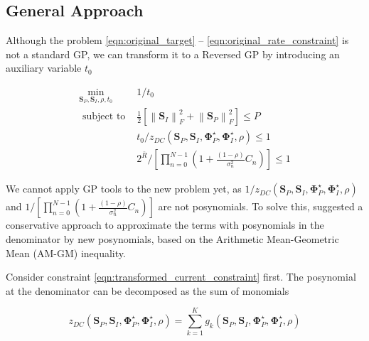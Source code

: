 \subsection{General Approach}\label{sec:general-approach}
Although the problem \eqref{eqn:original_target} -- \eqref{eqn:original_rate_constraint} is not a standard GP, we can transform it to a Reversed GP by introducing an auxiliary variable ${t_0}$ \cite{Chiang2005}

\begin{eqnarray}
  {\mathop {\min }\limits_{{{\mathbf{S}}_P},{{\mathbf{S}}_I},\rho ,{t_0}} }&{1/{t_0}} \label{eqn:transformed_target} \\
  {{\text{ subject to }}}&{\frac{1}{2}\left[ {\left\| {{{\mathbf{S}}_I}} \right\|_F^2 + \left\| {{{\mathbf{S}}_P}} \right\|_F^2} \right] \leqslant P} \label{eqn:transformed_power_constraint} \\
  {}&{{t_0}/{z_{DC}}\left( {{{\mathbf{S}}_P},{{\mathbf{S}}_I},{\mathbf{\Phi }}_P^ \star ,{\mathbf{\Phi }}_I^ \star ,\rho } \right) \leqslant 1} \label{eqn:transformed_current_constraint} \\
  {}&{{2^{\bar R}}/\left[ {\prod\limits_{n = 0}^{N - 1} {\left( {1 + \frac{{(1 - \rho )}}{{\sigma _n^2}}{C_n}} \right)} } \right] \leqslant 1} \label{eqn:transformed_rate_constraint}
\end{eqnarray}

We cannot apply GP tools to the new problem yet, as $1/{z_{DC}}\left( {{{\mathbf{S}}_P},{{\mathbf{S}}_I},{\mathbf{\Phi }}_P^ \star ,{\mathbf{\Phi }}_I^ \star ,\rho } \right)$ and $1/\left[ {\prod\nolimits_{n = 0}^{N - 1} {\left( {1 + \frac{{(1 - \rho )}}{{\sigma _n^2}}{C_n}} \right)} } \right]$ are not posynomials. To solve this, \cite{Clerckx2018} suggested a conservative approach to approximate the terms with posynomials in the denominator by new posynomials, based on the Arithmetic Mean-Geometric Mean (AM-GM) inequality.

Consider constraint \eqref{eqn:transformed_current_constraint} first. The posynomial at the denominator can be decomposed as the sum of monomials

\begin{equation}\label{eqn:transformed_current_posynomial_decomposition}
  {z_{DC}}\left( {{{\mathbf{S}}_P},{{\mathbf{S}}_I},{\mathbf{\Phi }}_P^ \star ,{\mathbf{\Phi }}_I^ \star ,\rho } \right) = \sum\limits_{k = 1}^K {{g_k}\left( {{{\mathbf{S}}_P},{{\mathbf{S}}_I},{\mathbf{\Phi }}_P^ \star ,{\mathbf{\Phi }}_I^ \star ,\rho } \right)}
\end{equation}

